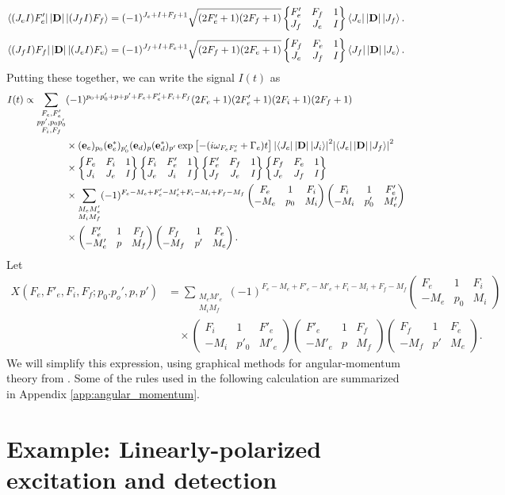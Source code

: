 \documentclass[11pt]{article}
\newcommand{\F}{\mathcal{F}}
\newcommand{\lb}{\left[}
\newcommand{\rb}{\right]}
\newcommand{\tj}[6]{ \begin{pmatrix}
		#1 & #2 & #3 \\
		#4 & #5 & #6 
\end{pmatrix}}
\newcommand{\Gj}[6]{ \begin{Bmatrix}
		#1 & #2 & #3 \\
		#4 & #5 & #6 
\end{Bmatrix}}
\begin{document}
\begin{align*}
\bra{(J_e I)F_e'}\abs{\mathbf{D}} \ket{(J_f I)F_f}
= (-1)^{J_e + I + F_f + 1}\sqrt{(2F'_e + 1)(2F_f+1)} 
\Gj{F'_e}{F_f}{1}{J_f}{J_e}{I}\bra{J_e}\abs{\mathbf{D}} \ket{J_f}.
\end{align*}
\begin{align*}
\bra{(J_f I)F_f} \abs{\mathbf{D}} \ket{(J_e I)F_e}
= (-1)^{J_f + I + F_e + 1}\sqrt{(2F_f + 1)(2F_e+1)} 
\Gj{F_f}{F_e}{1}{J_e}{J_f}{I}\bra{J_f}\abs{\mathbf{D}} \ket{J_e}.
\end{align*}
Putting these together, we can write the signal $I(t)$ as
\begin{align*}
I(t) 
\propto 
\sum_{\substack{F_e, F'_e\\pp', p_0p'_0\\F_i, F_f}}
&(-1)^{p_0 + p'_0 + p + p' + F_e + F_e' + F_i + F_f}(2F_e + 1)(2F'_e+1)(2F_i + 1)(2F_f+1)\\
& \times (\mathbf{e}_e)_{p_0}(\mathbf{e}^*_e)_{p_0'}(\mathbf{e}_d)_{p}(\mathbf{e}_d^*)_{p'} \exp\lb -(i\omega_{F_eF'_e} + \Gamma_e)t \rb\abs{\bra{J_e} \abs{\mathbf{D}}\ket{J_i}}^2\abs{ \bra{J_e} \abs{\mathbf{D}} \ket{J_f}}^2\\
&\times \Gj{F_e}{F_i}{1}{J_i}{J_e}{I}\Gj{F_i}{F'_e}{1}{J_e}{J_i}{I}\Gj{F'_e}{F_f}{1}{J_f}{J_e}{I}\Gj{F_f}{F_e}{1}{J_e}{J_f}{I}\\
&\times \sum_{\substack{M_eM'_e\\ M_i M_f}}(-1)^{F_e - M_e + F'_e - M'_e + F_i - M_i + F_f - M_f} \tj{F_e}{1}{F_i}{-M_e}{p_0}{M_i}\tj{F_i}{1}{F'_e}{-M_i}{p'_0}{M'_e}\\
&\times \tj{F'_e}{1}{F_f}{-M'_e}{p}{M_f}\tj{F_f}{1}{F_e}{-M_f}{p'}{M_e}.
\end{align*}
Let 
\begin{align*}
X(F_e,F'_e,F_i,F_f;p_0.p_o',p,p') &= \sum_{\substack{M_eM'_e\\ M_i M_f}}(-1)^{F_e - M_e + F'_e - M'_e + F_i - M_i + F_f - M_f} \tj{F_e}{1}{F_i}{-M_e}{p_0}{M_i}\\ 
&\quad \times 
\tj{F_i}{1}{F'_e}{-M_i}{p'_0}{M'_e}
\tj{F'_e}{1}{F_f}{-M'_e}{p}{M_f}
\tj{F_f}{1}{F_e}{-M_f}{p'}{M_e}.
\end{align*}
We will simplify this expression, using graphical methods for angular-momentum theory from \cite{angular_momentum}. Some of the rules used in the following calculation are summarized in Appendix \ref{app:angular_momentum}.





\section{Example: Linearly-polarized excitation and detection}
\end{document}
